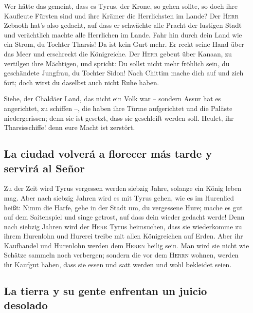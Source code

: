  Wer hätte das gemeint, dass es Tyrus, der Krone, so gehen
sollte, so doch ihre Kaufleute Fürsten sind und ihre Krämer die
Herrlichsten im Lande?  Der \textsc{Herr} Zebaoth hat's
also gedacht, auf dass er schwächte alle Pracht der lustigen Stadt und
verächtlich machte alle Herrlichen im Lande.  Fahr hin
durch dein Land wie ein Strom, du Tochter Tharsis! Da ist kein Gurt
mehr.  Er reckt seine Hand über das Meer und erschreckt
die Königreiche. Der \textsc{Herr} gebeut über Kanaan, zu vertilgen ihre
Mächtigen,  und spricht: Du sollst nicht mehr fröhlich
sein, du geschändete Jungfrau, du Tochter Sidon! Nach Chittim mache dich
auf und zieh fort; doch wirst du daselbst auch nicht Ruhe haben.

 Siehe, der Chaldäer Land, das nicht ein Volk war --
sondern Assur hat es angerichtet, zu schiffen --, die haben ihre Türme
aufgerichtet und die Paläste niedergerissen; denn sie ist gesetzt, dass
sie geschleift werden soll.  Heulet, ihr Tharsisschiffe!
denn eure Macht ist zerstört.

\hypertarget{la-ciudad-volveruxe1-a-florecer-muxe1s-tarde-y-serviruxe1-al-seuxf1or}{%
\subsection{La ciudad volverá a florecer más tarde y servirá al
Señor}\label{la-ciudad-volveruxe1-a-florecer-muxe1s-tarde-y-serviruxe1-al-seuxf1or}}

 Zu der Zeit wird Tyrus vergessen werden siebzig Jahre,
solange ein König leben mag. Aber nach siebzig Jahren wird es mit Tyrus
gehen, wie es im Hurenlied heißt:  Nimm die Harfe, gehe
in der Stadt um, du vergessene Hure; mache es gut auf dem Saitenspiel
und singe getrost, auf dass dein wieder gedacht werde! 
Denn nach siebzig Jahren wird der \textsc{Herr} Tyrus heimsuchen, dass
sie wiederkomme zu ihrem Hurenlohn und Hurerei treibe mit allen
Königreichen auf Erden.  Aber ihr Kaufhandel und
Hurenlohn werden dem \textsc{Herrn} heilig sein. Man wird sie nicht wie
Schätze sammeln noch verbergen; sondern die vor dem \textsc{Herrn}
wohnen, werden ihr Kaufgut haben, dass sie essen und satt werden und
wohl bekleidet seien.

\hypertarget{la-tierra-y-su-gente-enfrentan-un-juicio-desolado}{%
\subsection{La tierra y su gente enfrentan un juicio
desolado}\label{la-tierra-y-su-gente-enfrentan-un-juicio-desolado}}

